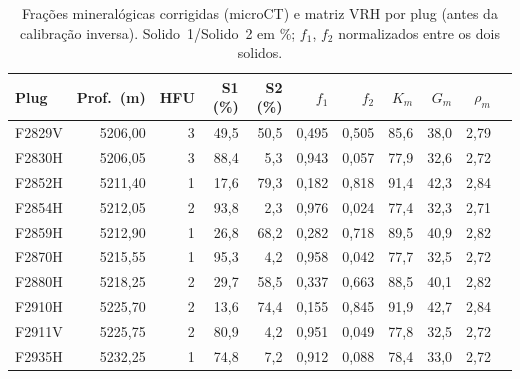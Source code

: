 \documentclass[11pt,a4paper]{article}
\numberwithin{equation}{section}
\begin{document}
\begin{table}[H]
  \centering
  \caption{Frações mineralógicas corrigidas (microCT) e matriz VRH por plug
           (antes da calibração inversa). Solido~1/Solido~2 em \%; $f_1$, $f_2$
           normalizados entre os dois solidos.}
  \label{tab:app_plug_mineral}
  \scriptsize
  \setlength{\tabcolsep}{3pt}
  \begin{tabular}{lrrrrrrrrrr}
    \toprule
    Plug & Prof.\ (m) & HFU &
    S1 (\%) & S2 (\%) & $f_1$ & $f_2$ &
    $K_m$ & $G_m$ & $\rho_m$ \\
    \midrule
    F2829V & 5206,00 & 3 & 49,5 & 50,5 & 0,495 & 0,505 & 85,6 & 38,0 & 2,79 \\
    F2830H & 5206,05 & 3 & 88,4 &  5,3 & 0,943 & 0,057 & 77,9 & 32,6 & 2,72 \\
    F2852H & 5211,40 & 1 & 17,6 & 79,3 & 0,182 & 0,818 & 91,4 & 42,3 & 2,84 \\
    F2854H & 5212,05 & 2 & 93,8 &  2,3 & 0,976 & 0,024 & 77,4 & 32,3 & 2,71 \\
    F2859H & 5212,90 & 1 & 26,8 & 68,2 & 0,282 & 0,718 & 89,5 & 40,9 & 2,82 \\
    F2870H & 5215,55 & 1 & 95,3 &  4,2 & 0,958 & 0,042 & 77,7 & 32,5 & 2,72 \\
    F2880H & 5218,25 & 2 & 29,7 & 58,5 & 0,337 & 0,663 & 88,5 & 40,1 & 2,82 \\
    F2910H & 5225,70 & 2 & 13,6 & 74,4 & 0,155 & 0,845 & 91,9 & 42,7 & 2,84 \\
    F2911V & 5225,75 & 2 & 80,9 &  4,2 & 0,951 & 0,049 & 77,8 & 32,5 & 2,72 \\
    F2935H & 5232,25 & 1 & 74,8 &  7,2 & 0,912 & 0,088 & 78,4 & 33,0 & 2,72 \\
    \bottomrule
  \end{tabular}
\end{table}
\end{document}

